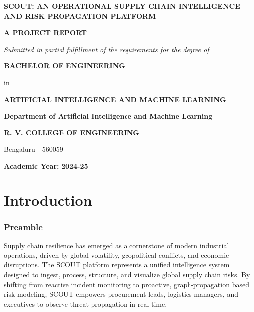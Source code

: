 \documentclass[12pt]{report}
\begin{document}
\thispagestyle{plain}

\begin{titlepage}
\begin{center}
\vspace*{1in}
{\fontsize{16}{20}\bfseries SCOUT: AN OPERATIONAL SUPPLY CHAIN INTELLIGENCE AND RISK PROPAGATION PLATFORM\par}
\vspace{1.5in}
{\fontsize{14}{18}\bfseries A PROJECT REPORT\par}
\vspace{0.5in}
{\fontsize{12}{16}\itshape Submitted in partial fulfillment of the requirements for the degree of\par}
\vspace{0.2in}
{\fontsize{12}{16}\bfseries BACHELOR OF ENGINEERING\par}
in\par
{\fontsize{12}{16}\bfseries ARTIFICIAL INTELLIGENCE AND MACHINE LEARNING\par}
\vspace{1.5in}
{\fontsize{12}{16}\bfseries Department of Artificial Intelligence and Machine Learning\par}
{\fontsize{14}{18}\bfseries R. V. COLLEGE OF ENGINEERING\par}
{\fontsize{12}{16}\rmfamily Bengaluru - 560059\par}
\vspace{0.5in}
{\fontsize{12}{16}\bfseries Academic Year: 2024-25\par}
\end{center}
\end{titlepage}

\newpage
\thispagestyle{plain}
\tableofcontents

\newpage
\chapter{Introduction}
\thispagestyle{fancy}

\subsection{Preamble}
Supply chain resilience has emerged as a cornerstone of modern industrial operations, driven by global volatility, geopolitical conflicts, and economic disruptions. The SCOUT platform represents a unified intelligence system designed to ingest, process, structure, and visualize global supply chain risks. By shifting from reactive incident monitoring to proactive, graph-propagation based risk modeling, SCOUT empowers procurement leads, logistics managers, and executives to observe threat propagation in real time.
\end{document}
